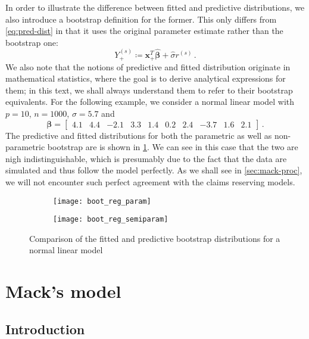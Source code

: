 \documentclass[a4paper]{book}
\begin{document}
In order to illustrate the difference between fitted and predictive distributions, we also introduce a bootstrap definition for the former. This only differs from \cref{eq:pred-dist} in that it uses the original parameter estimate rather than the bootstrap one:
\begin{equation} \label{eq:fit-dist}
  Y_+^{(s)} \coloneqq \mathbf{x}_+^T \widehat{\bm{\beta}} + \widehat{\sigma} r^{(s)} \,.
\end{equation}
We also note that the notions of predictive and fitted distribution originate in mathematical statistics, where the goal is to derive analytical expressions for them; in this text, we shall always understand them to refer to their bootstrap equivalents. For the following example, we consider a normal linear model with $p = 10$, $n = 1000$, $\sigma = 5.7$ and
\begin{displaymath}
  \bm{\beta} = \begin{bmatrix} 4.1 & 4.4 & -2.1 & 3.3 & 1.4 & 0.2 & 2.4 & -3.7 & 1.6 & 2.1 \end{bmatrix} \,.
\end{displaymath}
The predictive and fitted distributions for both the parametric as well as non-parametric bootstrap are is shown in \cref{fig:boot-reg}. We can see in this case that the two are nigh indistinguishable, which is presumably due to the fact that the data are simulated and thus follow the model perfectly. As we shall see in \cref{sec:mack-proc}, we will not encounter such perfect agreement with the claims reserving models.

\begin{figure}[!htb]
  \begin{subfigure}{\linewidth}
    \texttt{[image: boot\_reg\_param]}
  \end{subfigure}
  \begin{subfigure}{\linewidth}
    \texttt{[image: boot\_reg\_semiparam]}
  \end{subfigure}
  \caption{Comparison of the fitted and predictive bootstrap distributions for a normal linear model}
  \label{fig:boot-reg}
\end{figure}

\chapter{Mack's model} \label{chapter:mack}

\section{Introduction} \label{sec:mack-intro}
\end{document}
